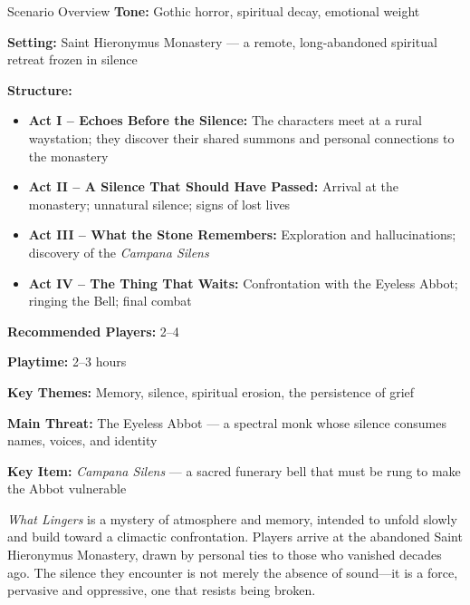 \documentclass[nodeprecatedcode,bg=print]{dndbook/dndbook}
\begin{document}
\begin{WyrdSidebar}[float=!b]{Scenario Overview}
    \textbf{Tone:} Gothic horror, spiritual decay, emotional weight
    
    \noindent
    \textbf{Setting:} Saint Hieronymus Monastery — a remote, long-abandoned spiritual retreat frozen in silence
    
    \noindent
    \textbf{Structure:}
    \begin{itemize}
        \item \textbf{Act I – Echoes Before the Silence:} The characters meet at a rural waystation; they discover their shared summons and personal connections to the monastery
        \item \textbf{Act II – A Silence That Should Have Passed:} Arrival at the monastery; unnatural silence; signs of lost lives
        \item \textbf{Act III – What the Stone Remembers:} Exploration and hallucinations; discovery of the \emph{Campana Silens}
        \item \textbf{Act IV – The Thing That Waits:} Confrontation with the Eyeless Abbot; ringing the Bell; final combat
    \end{itemize}
    
    \noindent
    \textbf{Recommended Players:} 2–4
    
    \noindent
    \textbf{Playtime:} 2–3 hours
    
    \noindent
    \textbf{Key Themes:} Memory, silence, spiritual erosion, the persistence of grief
    
    \noindent
    \textbf{Main Threat:} The Eyeless Abbot — a spectral monk whose silence consumes names, voices, and identity
    
    \noindent
    \textbf{Key Item:} \emph{Campana Silens} — a sacred funerary bell that must be rung to make the Abbot vulnerable
\end{WyrdSidebar}
    
\emph{What Lingers} is a mystery of atmosphere and memory, intended to unfold slowly and build toward a climactic confrontation. Players arrive at the abandoned Saint Hieronymus Monastery, drawn by personal ties to those who vanished decades ago. The silence they encounter is not merely the absence of sound—it is a force, pervasive and oppressive, one that resists being broken.
\end{document}
